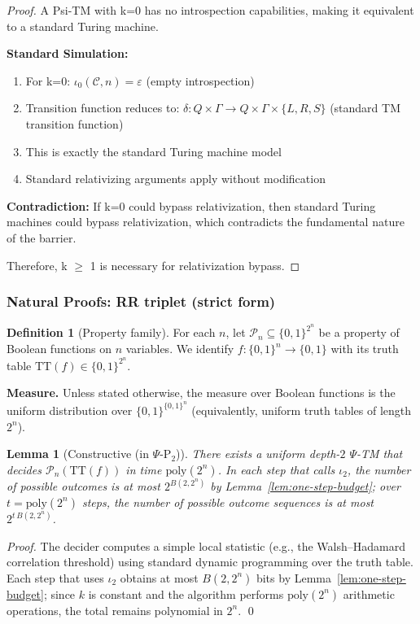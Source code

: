 \documentclass[11pt]{article}
\newtheorem{lemma}[theorem]{Lemma}
\theoremstyle{definition}
\newtheorem{definition}[theorem]{Definition}
\newcommand{\PSi}{\Psi}
\newcommand{\bits}{\{0,1\}}
\begin{document}
\begin{proof}
A Psi-TM with k=0 has no introspection capabilities, making it equivalent to a standard Turing machine.

\textbf{Standard Simulation:}
\begin{enumerate}
\item For k=0: $\iota_0(\mathcal{C}, n) = \varepsilon$ (empty introspection)
\item Transition function reduces to: $\delta: Q \times \Gamma \to Q \times \Gamma \times \{L, R, S\}$ (standard TM transition function)
\item This is exactly the standard Turing machine model
\item Standard relativizing arguments apply without modification
\end{enumerate}

\textbf{Contradiction:} If k=0 could bypass relativization, then standard Turing machines could bypass relativization, which contradicts the fundamental nature of the barrier.

Therefore, k $\geq$ 1 is necessary for relativization bypass.
\end{proof}

\subsubsection{Natural Proofs: RR triplet (strict form)}
\label{sec:natural-rr}

\begin{definition}[Property family]
For each $n$, let $\mathcal{P}_n\subseteq \{0,1\}^{2^n}$ be a property of Boolean functions on $n$ variables. We identify $f:\bits^n\to\bits$ with its truth table $\mathrm{TT}(f)\in\bits^{2^n}$.
\end{definition}

\noindent\textbf{Measure.} Unless stated otherwise, the measure over Boolean functions is the uniform distribution over $\{0,1\}^{\{0,1\}^n}$ (equivalently, uniform truth tables of length $2^n$).

\begin{lemma}[Constructive (in $\Psi$-P$_2$)]
There exists a uniform depth-$2$ $\PSi$-TM that decides $\mathcal{P}_n(\mathrm{TT}(f))$ in time $\mathrm{poly}(2^n)$. In each step that calls $\iota_2$, the number of possible outcomes is at most $2^{B(2,2^n)}$ by Lemma~\ref{lem:one-step-budget}; over $t=\mathrm{poly}(2^n)$ steps, the number of possible outcome sequences is at most $2^{t\,B(2,2^n)}$.
\end{lemma}
\begin{proof}
The decider computes a simple local statistic (e.g., the Walsh--Hadamard correlation threshold) using standard dynamic programming over the truth table. Each step that uses $\iota_2$ obtains at most $B(2,2^n)$ bits by Lemma~\ref{lem:one-step-budget}; since $k$ is constant and the algorithm performs $\mathrm{poly}(2^n)$ arithmetic operations, the total remains polynomial in $2^n$. \qed
\end{proof}
\end{document}
